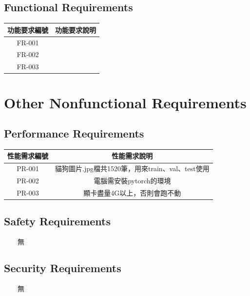\documentclass{scrreprt}
\begin{document}
\begin{CJK*}{UTF8}{bsmi}
\section{Functional Requirements}
\begin{center}
    \begin{tabular}{|c|c|}
        \hline
	    功能要求編號 & 功能要求說明 \\
        \hline
	    FR-001 & \\ 
        \hline
	    FR-002 & \\
        \hline
	    FR-003 & \\
        \hline
    \end{tabular}
\end{center}



\chapter{Other Nonfunctional Requirements}

\section{Performance Requirements}
\begin{center}
    \begin{tabular}{|c|c|}
        \hline
	    性能需求編號 & 性能需求說明 \\
        \hline
	    PR-001 & 貓狗圖片.jpg檔共1520筆，用來train、val、test使用\\
        \hline
	    PR-002 & 電腦需安裝pytorch的環境\\
        \hline
	    PR-003 & 顯卡盡量4G以上，否則會跑不動\\
        \hline
    \end{tabular}
\end{center}

\section{Safety Requirements} 
　　無
\section{Security Requirements}
　　無

\end{CJK*}
\end{document}
